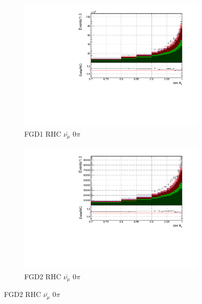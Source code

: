 \begin{figure}[!h]
\begin{subfigure}{0.49\textwidth}
  \centering
  \includegraphics[width=\textwidth]{figs/FGD1_anti-numuCC_0pi_t}
  \caption{FGD1 RHC $\bar{\nu_{\mu}}$ 0$\pi$}
\end{subfigure}
\begin{subfigure}{0.49\textwidth}
  \centering
  \includegraphics[width=\textwidth]{figs/FGD2_anti-numuCC_0pi_t}
  \caption{FGD2 RHC $\bar{\nu_{\mu}}$ 0$\pi$}
\end{subfigure}


\end{figure}
